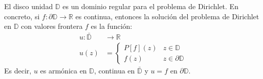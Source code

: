 \begin{theorem}
    El disco unidad $\mathbb{D}$ es un dominio regular para el problema de Dirichlet.
    En concreto, si $f: \partial\mathbb{D} \to \mathbb{R}$ es continua, entonces la solución del problema de Dirichlet en $\mathbb{D}$ con valores frontera $f$ es la función:
    \begin{align*}
        u: \bar{\mathbb{D}} & \to \mathbb{R}                       \\
        u(z)                & = \begin{cases}
                                    P[f](z) & z \in \mathbb{D}         \\
                                    f(z)    & z \in \partial\mathbb{D}
                                \end{cases}
    \end{align*}
    Es decir, $u$ es armónica en $\mathbb{D}$, continua en $\bar{\mathbb{D}}$ y $u = f$ en $\partial\mathbb{D}$.
\end{theorem}

